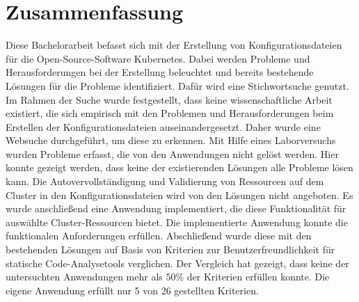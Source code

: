\chapter*{Zusammenfassung}


Diese Bachelorarbeit befasst sich mit der Erstellung von Konfigurationsdateien für die Open-Source-Software Kubernetes.
Dabei werden Probleme und Herausforderungen bei der Erstellung beleuchtet und bereits bestehende Lösungen
für die Probleme identifiziert. Dafür wird eine Stichwortsuche genutzt.
Im Rahmen der Suche wurde festgestellt, dass keine wissenschaftliche Arbeit existiert, die sich empirisch mit den Problemen und Herausforderungen
beim Erstellen der Konfigurationsdateien auseinandergesetzt.
Daher wurde eine Websuche durchgeführt, um diese zu erkennen.
Mit Hilfe eines Laborversuchs wurden Probleme erfasst, die von den Anwendungen nicht gelöst werden.
Hier konnte gezeigt werden, dass keine der existierenden Lösungen alle Probleme lösen kann.
Die Autovervollständigung und Validierung von Ressourcen auf dem Cluster in den Konfigurationsdateien wird von den Lösungen nicht angeboten.
Es wurde anschließend eine Anwendung implementiert, die diese Funktionalität für auswählte Cluster-Ressourcen bietet.
Die implementierte Anwendung konnte die funktionalen Anforderungen erfüllen.
Abschließend wurde diese mit den bestehenden Lösungen auf Basis von Kriterien zur Benutzerfreundlichkeit für statische Code-Analysetools verglichen.
Der Vergleich hat gezeigt, dass keine der untersuchten Anwendungen mehr als $50\%$ der Kriterien erfüllen konnte.
Die eigene Anwendung erfüllt nur 5 von 26 gestellten Kriterien.

